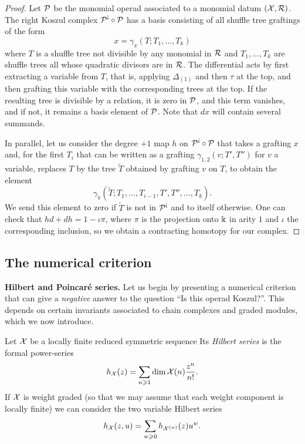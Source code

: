 \begin{proof}
Let ${\mathcal{P}}$ be the monomial operad associated to a monomial datum $(\mathcal{X},\mathcal{R})$.
The right Koszul complex $\PP^\antishriek\circ\PP$ has a basis consisting
of all shuffle tree graftings of the form
\[ x = \gamma_{\pi}(T; T_1,\ldots,T_k) 
\]
where $T$ is a shuffle tree not divisible by any monomial in $\mathcal{R}$ and
$T_1,\ldots,T_k$ are shuffle trees all whose quadratic divisors are in $\mathcal{R}$.
The differential acts by first extracting a variable from $T$, that is,
applying $\Delta_{(1)}$ and then $\tau$ at the top, and then grafting this
variable with the corresponding trees at the top. If the resulting tree 
is divisible by a relation, it is zero in ${\mathcal{P}}$, and this term vanishes,
and if not, it remains a basis element of ${\mathcal{P}}$. Note that $dx$ will 
contain several summands. 

In parallel, let us consider the degree $+1$ map $h$ on $\PP^\antishriek\circ\PP$
that takes a grafting $x$ and, for the first $T_i$ that can be written as a
grafting $\gamma_{1,2}(v ; T',T'')$ for $v$ a variable, replaces
$T$ by the tree $\tilde{T}$ obtained by grafting $v$ on $T$, to obtain the element
\[
\gamma_{\tilde{\pi}}(\tilde{T}; T_1,\ldots,T_{i-1},T',T'',\ldots,T_k).
\]
We send this element to zero if $\tilde{T}$ is not in $\PP^\antishriek$
and to itself otherwise. One can check that $hd + dh = 1-\iota\pi$, 
where $\pi$ is the projection onto $\Bbbk$ in arity $1$ and $\iota$ the 
corresponding inclusion, so we obtain a contracting homotopy for our complex.
\end{proof}
\subsection{The numerical criterion}

\textbf{Hilbert and Poincar\'e series.} Let us begin
by presenting a numerical criterion that can give a \emph{negative}
answer to the question ``Is this operad Koszul?''. This
depends on certain invariants associated to chain complexes
and graded modules, which we now introduce.

\begin{definition}
Let $\mathcal{X}$ be a locally finite reduced symmetric sequence
Its \emph{Hilbert series} is the formal power-series
\[
h_{\mathcal{X}}(z) = \sum_{n\geqslant 1} \dim \mathcal{X}(n) \frac{z^n}{n!}.
\]
If $\mathcal{X}$ is weight graded (so that we may assume that each
weight component is locally finite) we can consider the two
variable Hilbert series
 \[
h_{\mathcal{X}}(z,u) = \sum_{w\geqslant 0} h_{\mathcal{X}^{(w)}}(z) u^w.
\]
\end{definition}

